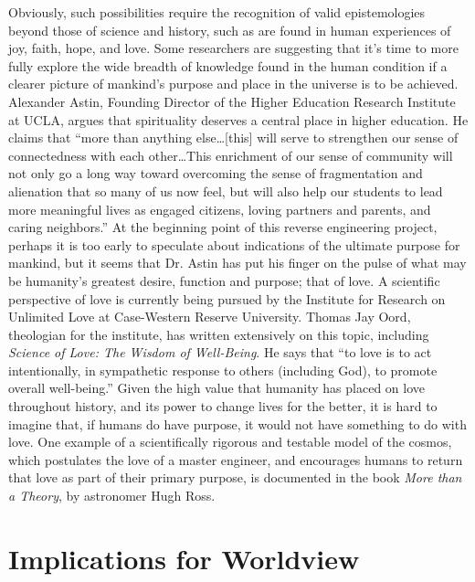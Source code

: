 Obviously, such possibilities require the recognition of valid
epistemologies beyond those of science and history, such as are found
in human experiences of joy, faith, hope, and love. Some researchers
are suggesting that it’s time to more fully explore the wide breadth of
knowledge found in the human condition if a clearer picture of
mankind’s purpose and place in the universe is to be achieved.
Alexander Astin, Founding Director of the Higher Education Research
Institute at UCLA, argues that spirituality deserves a central place in
higher education.\citep{astin2004} He claims that “more than
anything else…[this] will serve to strengthen our sense of
connectedness with each other…This enrichment of our sense of community
will not only go a long way toward overcoming the sense of
fragmentation and alienation that so many of us now feel, but will also
help our students to lead more meaningful lives as engaged citizens,
loving partners and parents, and caring neighbors.” At the beginning
point of this reverse engineering project, perhaps it is too early to
speculate about indications of the ultimate purpose for mankind, but it
seems that Dr. Astin has put his finger on the pulse of what may be
humanity’s greatest desire, function and purpose; that of love. A
scientific perspective of love is currently being pursued by the
Institute for Research on Unlimited Love at Case-Western Reserve
University. Thomas Jay Oord, theologian for the institute, has written
extensively on this topic, including \textit{Science of Love: The
Wisdom of Well-Being}.\citep{oord2004} He says that
“to love is to act intentionally, in
sympathetic response to others (including God), to promote overall
well-being.” Given the high value that humanity has placed on love
throughout history, and its power to change lives for the better, it is
hard to imagine that, if humans do have purpose, it would not have
something to do with love. One example of a scientifically rigorous and
testable model of the cosmos, which postulates the love of a master
engineer, and encourages humans to return that love as part of their
primary purpose, is documented in the book
\textit{More than a Theory},\citep{ross2009}
by astronomer Hugh Ross.

\section{Implications for Worldview}

